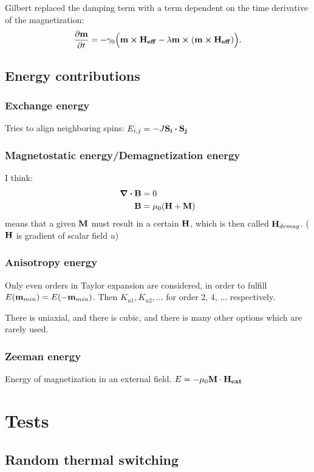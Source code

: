 \documentclass[10pt,a4paper]{article}
\begin{document}
Gilbert \cite{Gilbert1956} replaced the damping term with a term dependent on the time derivative of the magnetization:
\begin{equation}
	\frac{\partial \vb{m}}{\partial t} = - \gamma_0 \Big( \vb{m} \cross \vb{H_{eff}} - \lambda \vb{m} \cross (\vb{m} \cross \vb{H_{eff}}) \Big) \mathrm{.}
\end{equation}

\subsection{Energy contributions}
\subsubsection{Exchange energy}
Tries to align neighboring spins:
$E_{i,j} = -J \vb{S_i} \vdot \vb{S_j}$
\subsubsection{Magnetostatic energy/Demagnetization energy}
I think:
\begin{align}
	\div{\vb{B}} &= 0 \\
	\vb{B} &= \mu_0 (\vb{H} + \vb{M})
\end{align}
means that a given $\vb{M}$ must result in a certain $\vb{H}$, which is then called $\vb{H}_{demag}$.
($\vb{H}$ is gradient of scalar field $u$)

\subsubsection{Anisotropy energy}
Only even orders in Taylor expansion are considered, in order to fulfill $E(\vb{m}_{min}) = E(-\vb{m}_{min})$. Then $K_{u1}, K_{u2}, \dots$ for order 2, 4, ... respectively.

There is uniaxial, and there is cubic, and there is many other options which are rarely used.

\subsubsection{Zeeman energy}
Energy of magnetization in an external field.
$E = -\mu_0 \vb{M} \cdot \vb{H_{ext}}$

\section{Tests}
\subsection{Random thermal switching}
\end{document}

